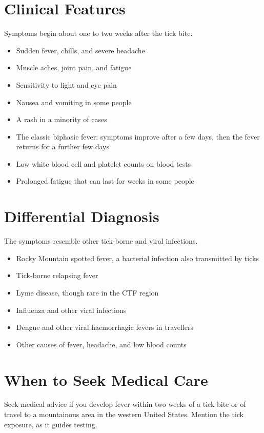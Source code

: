\section*{Clinical Features}
Symptoms begin about one to two weeks after the tick bite.

\begin{itemize}
    \item Sudden fever, chills, and severe headache
    \item Muscle aches, joint pain, and fatigue
    \item Sensitivity to light and eye pain
    \item Nausea and vomiting in some people
    \item A rash in a minority of cases
    \item The classic biphasic fever: symptoms improve after a few days, then the fever returns for a further few days
    \item Low white blood cell and platelet counts on blood tests
    \item Prolonged fatigue that can last for weeks in some people
\end{itemize}

\section*{Differential Diagnosis}
The symptoms resemble other tick-borne and viral infections.

\begin{itemize}
    \item Rocky Mountain spotted fever, a bacterial infection also transmitted by ticks
    \item Tick-borne relapsing fever
    \item Lyme disease, though rare in the CTF region
    \item Influenza and other viral infections
    \item Dengue and other viral haemorrhagic fevers in travellers
    \item Other causes of fever, headache, and low blood counts
\end{itemize}

\section*{When to Seek Medical Care}
Seek medical advice if you develop fever within two weeks of a tick bite or of travel to a mountainous area in the western United States. Mention the tick exposure, as it guides testing.

